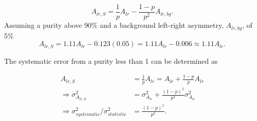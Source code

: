 \begin{equation}
  A_{lr,S} = \frac{1}{p} A_{lr} - \frac{1-p}{p^2} A_{lr,bg}.
\end{equation}
\noindent
Assuming a purity above 90\% and a background left-right asymmetry, $A_{lr,bg}$,
of 5\%
\begin{equation}
  A_{lr,S} = 1.11 A_{lr} - 0.123(0.05) = 1.11 A_{lr} - 0.006\approx 1.11 A_{lr}.
\end{equation}

The systematic error from a purity less than 1 can be determined as

\begin{align}
  A_{lr,S} &= \frac{1}{p}A_{lr} = A_{lr} + \frac{1-p}{p}A_{lr}
  \\ \nonumber
  \Rightarrow \sigma^2_{A_{lr,S}} &= \sigma^2_{A_{lr}} + \frac{(1-p)^2}{p^2} \sigma^2_{A_{lr}}
  \\ \nonumber
  \Rightarrow \sigma^2_{systematic}/\sigma^2_{statistic} &= \frac{(1-p)^2}{p^2}.
\end{align}
